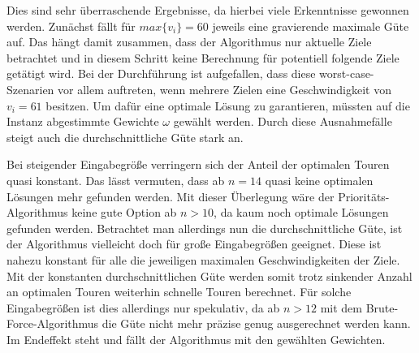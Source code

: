 \documentclass[german,version-2019-11]{uzl-thesis}
\begin{document}
\begin{table}[htpb]
\centering
{}
\caption{Güte des Prioritäts-Algorithmus}
\label{tab:ExpGüte}
\end{table}

Dies sind sehr überraschende Ergebnisse, da hierbei viele Erkenntnisse gewonnen werden. Zunächst fällt für $max\{v_i\}=60$ jeweils eine gravierende maximale Güte auf. Das hängt damit zusammen, dass der Algorithmus nur aktuelle Ziele betrachtet und in diesem Schritt keine Berechnung für potentiell folgende Ziele getätigt wird. Bei der Durchführung ist aufgefallen, dass diese worst-case-Szenarien vor allem auftreten, wenn mehrere Zielen eine Geschwindigkeit von $v_i=61$ besitzen. Um dafür eine optimale Lösung zu garantieren, müssten auf die Instanz abgestimmte Gewichte $\omega$ gewählt werden. Durch diese Ausnahmefälle steigt auch die durchschnittliche Güte stark an. 

Bei steigender Eingabegröße verringern sich der Anteil der optimalen Touren quasi konstant. Das lässt vermuten, dass ab $n=14$ quasi keine optimalen Lösungen mehr gefunden werden. Mit dieser Überlegung wäre der Prioritäts-Algorithmus keine gute Option ab $n>10$, da kaum noch optimale Lösungen gefunden werden. Betrachtet man allerdings nun die durchschnittliche Güte, ist der Algorithmus vielleicht doch für große Eingabegrößen geeignet. Diese ist nahezu konstant für alle die jeweiligen maximalen Geschwindigkeiten der Ziele. Mit der konstanten durchschnittlichen Güte werden somit trotz sinkender Anzahl an optimalen Touren weiterhin schnelle Touren berechnet. Für solche Eingabegrößen ist dies allerdings nur spekulativ, da ab $n>12$ mit dem Brute-Force-Algorithmus die Güte nicht mehr präzise genug ausgerechnet werden kann. Im Endeffekt steht und fällt der Algorithmus mit den gewählten Gewichten.
\end{document}

